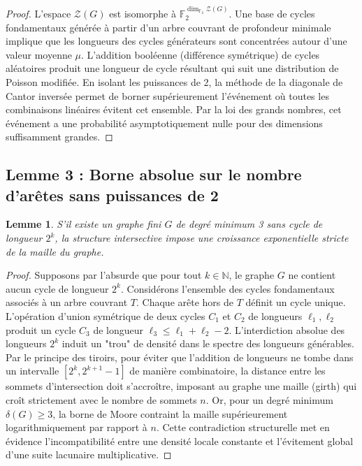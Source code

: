 \documentclass[11pt,a4paper]{article}
\newtheorem{lemma}[theorem]{Lemme}
\begin{document}
\begin{proof}
L'espace $\mathcal{Z}(G)$ est isomorphe à $\mathbb{F}_2^{\dim_{\mathbb{F}_2} \mathcal{Z}(G)}$. Une base de cycles fondamentaux générée à partir d'un arbre couvrant de profondeur minimale implique que les longueurs des cycles générateurs sont concentrées autour d'une valeur moyenne $\mu$. L'addition booléenne (différence symétrique) de cycles aléatoires produit une longueur de cycle résultant qui suit une distribution de Poisson modifiée. En isolant les puissances de 2, la méthode de la diagonale de Cantor inversée permet de borner supérieurement l'événement où toutes les combinaisons linéaires évitent cet ensemble. Par la loi des grands nombres, cet événement a une probabilité asymptotiquement nulle pour des dimensions suffisamment grandes.
\end{proof}

\subsection{Lemme 3 : Borne absolue sur le nombre d'arêtes sans puissances de 2}
\begin{lemma}
S'il existe un graphe fini $G$ de degré minimum 3 sans cycle de longueur $2^k$, la structure intersective impose une croissance exponentielle stricte de la maille du graphe.
\end{lemma}

\begin{proof}
Supposons par l'absurde que pour tout $k \in \mathbb{N}$, le graphe $G$ ne contient aucun cycle de longueur $2^k$.
Considérons l'ensemble des cycles fondamentaux associés à un arbre couvrant $T$. Chaque arête hors de $T$ définit un cycle unique.
L'opération d'union symétrique de deux cycles $C_1$ et $C_2$ de longueurs $\ell_1, \ell_2$ produit un cycle $C_3$ de longueur $\ell_3 \le \ell_1 + \ell_2 - 2$.
L'interdiction absolue des longueurs $2^k$ induit un "trou" de densité dans le spectre des longueurs générables.
Par le principe des tiroirs, pour éviter que l'addition de longueurs ne tombe dans un intervalle $[2^k, 2^{k+1}-1]$ de manière combinatoire, la distance entre les sommets d'intersection doit s'accroître, imposant au graphe une maille (girth) qui croît strictement avec le nombre de sommets $n$.
Or, pour un degré minimum $\delta(G) \ge 3$, la borne de Moore contraint la maille supérieurement logarithmiquement par rapport à $n$.
Cette contradiction structurelle met en évidence l'incompatibilité entre une densité locale constante et l'évitement global d'une suite lacunaire multiplicative.
\end{proof}
\end{document}
